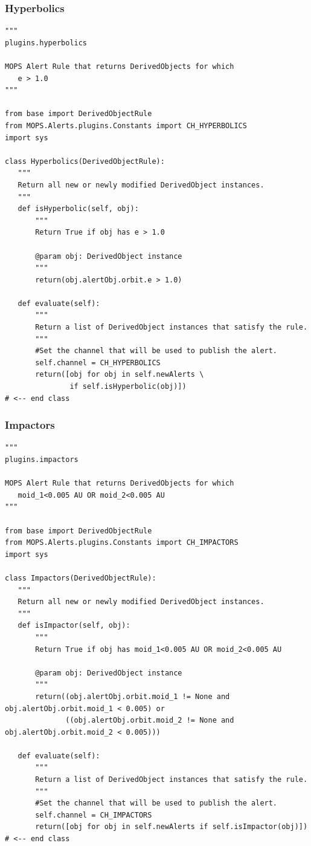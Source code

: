 \documentclass[panstarrs]{panstarrs}
\begin{document}
\begin{appendices}
\subsubsection{Hyperbolics}
\begin{verbatim}
"""
plugins.hyperbolics

MOPS Alert Rule that returns DerivedObjects for which
   e > 1.0
"""

from base import DerivedObjectRule
from MOPS.Alerts.plugins.Constants import CH_HYPERBOLICS
import sys

class Hyperbolics(DerivedObjectRule):
   """
   Return all new or newly modified DerivedObject instances.
   """
   def isHyperbolic(self, obj):
       """
       Return True if obj has e > 1.0

       @param obj: DerivedObject instance
       """
       return(obj.alertObj.orbit.e > 1.0)
 
   def evaluate(self):
       """
       Return a list of DerivedObject instances that satisfy the rule.
       """
       #Set the channel that will be used to publish the alert.
       self.channel = CH_HYPERBOLICS
       return([obj for obj in self.newAlerts \
               if self.isHyperbolic(obj)])
# <-- end class
\end{verbatim}

\subsubsection{Impactors}
\begin{verbatim}
"""
plugins.impactors

MOPS Alert Rule that returns DerivedObjects for which
   moid_1<0.005 AU OR moid_2<0.005 AU
"""

from base import DerivedObjectRule
from MOPS.Alerts.plugins.Constants import CH_IMPACTORS
import sys

class Impactors(DerivedObjectRule):
   """
   Return all new or newly modified DerivedObject instances.
   """
   def isImpactor(self, obj):
       """
       Return True if obj has moid_1<0.005 AU OR moid_2<0.005 AU

       @param obj: DerivedObject instance
       """
       return((obj.alertObj.orbit.moid_1 != None and obj.alertObj.orbit.moid_1 < 0.005) or
              ((obj.alertObj.orbit.moid_2 != None and obj.alertObj.orbit.moid_2 < 0.005)))
   
   def evaluate(self):
       """
       Return a list of DerivedObject instances that satisfy the rule.
       """
       #Set the channel that will be used to publish the alert.
       self.channel = CH_IMPACTORS
       return([obj for obj in self.newAlerts if self.isImpactor(obj)])
# <-- end class
\end{verbatim}


\end{appendices}
\end{document}
